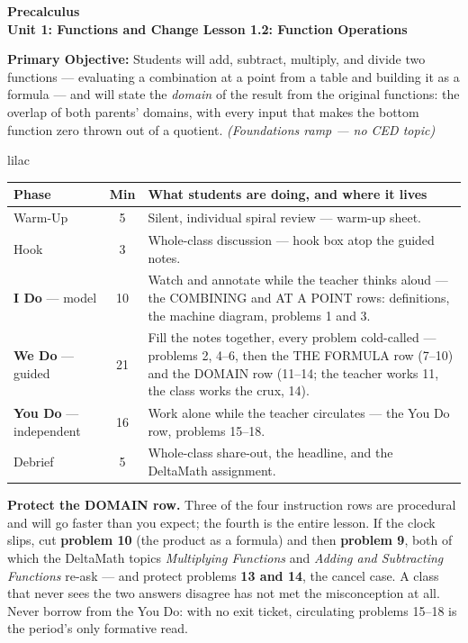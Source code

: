 \documentclass[10pt]{article}
\newcommand{\CourseName}{Precalculus}
\newcommand{\UnitNumberName}{Unit 1: Functions and Change \quad}
\newcommand{\LessonNumberName}{Lesson 1.2: Function Operations}
\begin{document}
\begin{center}
    {\Large\bfseries \CourseName \\
    {\small\bfseries \UnitNumberName \LessonNumberName}}
\end{center}

\begin{tcolorbox}[colback=lilac, colframe=plum, boxrule=0.9pt, arc=2mm,
    left=2mm, right=2mm, top=1.5mm, bottom=1.5mm]
    \textbf{Primary Objective:} Students will add, subtract, multiply, and divide
    two functions --- evaluating a combination at a point from a table and
    building it as a formula --- and will state the \textit{domain} of the result
    from the original functions: the overlap of both parents' domains, with every
    input that makes the bottom function zero thrown out of a quotient.
    \hfill\textit{\small (Foundations ramp --- no CED topic)}
\end{tcolorbox}

\boxguard[22]
\begin{skillbox}{lilac}
\small
\renewcommand{\arraystretch}{1.25}
\begin{tabularx}{\linewidth}{@{} l c X @{}}
\textbf{Phase} & \textbf{Min} & \textbf{What students are doing, and where it lives} \\
\midrule
Warm-Up                       & 5  & Silent, individual spiral review --- warm-up sheet. \\
Hook                          & 3  & Whole-class discussion --- hook box atop the guided notes. \\
\textbf{I Do} --- model       & 10 & Watch and annotate while the teacher thinks aloud --- the COMBINING and AT A POINT rows: definitions, the machine diagram, problems 1 and 3. \\
\textbf{We Do} --- guided     & 21 & Fill the notes together, every problem cold-called --- problems 2, 4--6, then the THE FORMULA row (7--10) and the DOMAIN row (11--14; the teacher works 11, the class works the crux, 14). \\
\textbf{You Do} --- independent & 16 & Work alone while the teacher circulates --- the You Do row, problems 15--18. \\
Debrief                       & 5  & Whole-class share-out, the headline, and the DeltaMath assignment. \\
\end{tabularx}

\smallskip
\textbf{Protect the DOMAIN row.} Three of the four instruction rows are
procedural and will go faster than you expect; the fourth is the entire lesson.
If the clock slips, cut \textbf{problem 10} (the product as a formula) and then
\textbf{problem 9}, both of which the DeltaMath topics \textit{Multiplying
Functions} and \textit{Adding and Subtracting Functions} re-ask --- and protect
problems \textbf{13 and 14}, the cancel case. A class that never sees the two
answers disagree has not met the misconception at all. Never borrow from the
You Do: with no exit ticket, circulating problems 15--18 is the period's only
formative read.
\end{skillbox}
\end{document}
